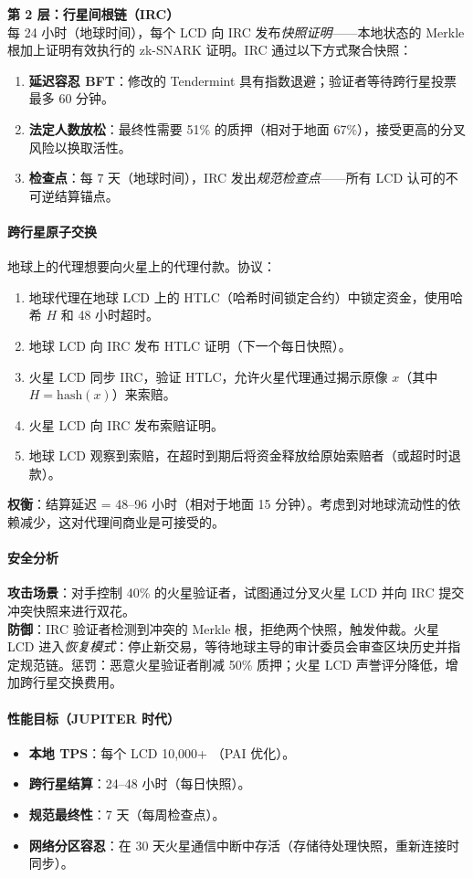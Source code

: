 \documentclass[11pt]{article}
\begin{document}
\textbf{第 2 层：行星间根链（IRC）}\\
每 24 小时（地球时间），每个 LCD 向 IRC 发布\emph{快照证明}——本地状态的 Merkle 根加上证明有效执行的 zk-SNARK 证明。IRC 通过以下方式聚合快照：
\begin{enumerate}[noitemsep]
  \item \textbf{延迟容忍 BFT}：修改的 Tendermint 具有指数退避；验证者等待跨行星投票最多 60 分钟。
  \item \textbf{法定人数放松}：最终性需要 51\% 的质押（相对于地面 67\%），接受更高的分叉风险以换取活性。
  \item \textbf{检查点}：每 7 天（地球时间），IRC 发出\emph{规范检查点}——所有 LCD 认可的不可逆结算锚点。
\end{enumerate}

\paragraph{跨行星原子交换}
地球上的代理想要向火星上的代理付款。协议：
\begin{enumerate}[noitemsep]
  \item 地球代理在地球 LCD 上的 HTLC（哈希时间锁定合约）中锁定资金，使用哈希 $H$ 和 48 小时超时。
  \item 地球 LCD 向 IRC 发布 HTLC 证明（下一个每日快照）。
  \item 火星 LCD 同步 IRC，验证 HTLC，允许火星代理通过揭示原像 $x$（其中 $H = \text{hash}(x)$）来索赔。
  \item 火星 LCD 向 IRC 发布索赔证明。
  \item 地球 LCD 观察到索赔，在超时到期后将资金释放给原始索赔者（或超时时退款）。
\end{enumerate}
\textbf{权衡}：结算延迟 = 48--96 小时（相对于地面 15 分钟）。考虑到对地球流动性的依赖减少，这对代理间商业是可接受的。

\paragraph{安全分析}
\textbf{攻击场景}：对手控制 40\% 的火星验证者，试图通过分叉火星 LCD 并向 IRC 提交冲突快照来进行双花。\\
\textbf{防御}：IRC 验证者检测到冲突的 Merkle 根，拒绝两个快照，触发仲裁。火星 LCD 进入\emph{恢复模式}：停止新交易，等待地球主导的审计委员会审查区块历史并指定规范链。惩罚：恶意火星验证者削减 50\% 质押；火星 LCD 声誉评分降低，增加跨行星交换费用。

\paragraph{性能目标（JUPITER 时代）}
\begin{itemize}[noitemsep]
  \item \textbf{本地 TPS}：每个 LCD 10,000+ （PAI 优化）。
  \item \textbf{跨行星结算}：24--48 小时（每日快照）。
  \item \textbf{规范最终性}：7 天（每周检查点）。
  \item \textbf{网络分区容忍}：在 30 天火星通信中断中存活（存储待处理快照，重新连接时同步）。
\end{itemize}
\end{document}
